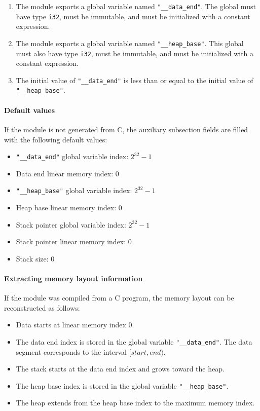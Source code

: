 \documentclass{article}
\begin{document}
\begin{enumerate}
\item The module exports a global variable named \verb|"__data_end"|.
      The global must have type \verb|i32|, must be immutable, and must be
      initialized with a constant expression.

\item The module exports a global variable named \verb|"__heap_base"|.
      This global must also have type \verb|i32|, must be immutable, and
      must be initialized with a constant expression.

\item The initial value of \verb|"__data_end"| is less than or equal to the
      initial value of \verb|"__heap_base"|.
\end{enumerate}

\paragraph{Default values}

If the module is not generated from C, the auxiliary subsection fields are filled with the following default values:

\begin{itemize}
\item \verb|"__data_end"| global variable index: $2^{32}-1$
\item Data end linear memory index: 0
\item \verb|"__heap_base"| global variable index: $2^{32}-1$
\item Heap base linear memory index: 0
\item Stack pointer global variable index: $2^{32}-1$
\item Stack pointer linear memory index: 0
\item Stack size: 0
\end{itemize}

\paragraph{Extracting memory layout information}

If the module was compiled from a C program, the memory layout can be
reconstructed as follows:

\begin{itemize}
\item Data starts at linear memory index 0.
\item The data end index is stored in the global variable
      \verb|"__data_end"|.
        The data segment corresponds to the interval $[start,end)$.
\item The stack starts at the data end index and grows toward the heap.
\item The heap base index is stored in the global variable \verb|"__heap_base"|.
\item The heap extends from the heap base index to the maximum memory index.
\end{itemize}
\end{document}
